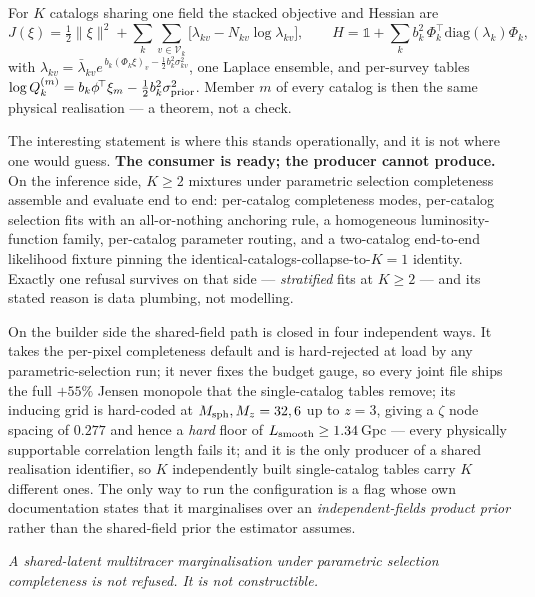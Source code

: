 \documentclass[11pt]{article}
\theoremstyle{definition}
\theoremstyle{remark}
\newcommand{\Msph}{M_{\rm sph}}
\newcommand{\Mz}{M_{z}}
\begin{document}
For $K$ catalogs sharing one field the stacked objective and Hessian are
\begin{equation}
  J(\xi)=\tfrac12\|\xi\|^2+\sum_{k}\sum_{v\in\mathcal V_k}
  \big[\lambda_{kv}-N_{kv}\log\lambda_{kv}\big],
  \qquad
  H=\mathbb 1+\sum_k b_k^2\,\Phi_k^{\!\top}\mathrm{diag}(\lambda_k)\Phi_k ,
  \label{eq:jointJ}
\end{equation}
with $\lambda_{kv}=\bar\lambda_{kv}e^{\,b_k(\Phi_k\xi)_v-\frac12b_k^2\sigma^2_{kv}}$,
one Laplace ensemble, and per-survey tables
$\log Q_k^{(m)}=b_k\phi^{\!\top}\xi_m-\frac12b_k^2\sigma^2_{\rm prior}$. Member $m$
of every catalog is then the same physical realisation --- a theorem, not a check.

The interesting statement is where this stands operationally, and it is not where
one would guess. \textbf{The consumer is ready; the producer cannot produce.} On
the inference side, $K\ge2$ mixtures under parametric selection completeness
assemble and evaluate end to end: per-catalog completeness modes, per-catalog
selection fits with an all-or-nothing anchoring rule, a homogeneous
luminosity-function family, per-catalog parameter routing, and a two-catalog
end-to-end likelihood fixture pinning the identical-catalogs-collapse-to-$K{=}1$
identity. Exactly one refusal survives on that side --- \emph{stratified} fits at
$K\ge2$ --- and its stated reason is data plumbing, not modelling.

On the builder side the shared-field path is closed in four independent ways. It
takes the per-pixel completeness default and is hard-rejected at load by any
parametric-selection run; it never fixes the budget gauge, so every joint file
ships the full $+55\%$ Jensen monopole that the single-catalog tables remove; its
inducing grid is hard-coded at $\Msph,\Mz=32,6$ up to $z=3$, giving a $\zeta$ node
spacing of $0.277$ and hence a \emph{hard} floor of $L_{\rm smooth}\ge1.34$\,Gpc ---
every physically supportable correlation length fails it; and it is the only
producer of a shared realisation identifier, so $K$ independently built
single-catalog tables carry $K$ different ones. The only way to run the
configuration is a flag whose own documentation states that it marginalises over
an \emph{independent-fields product prior} rather than the shared-field prior the
estimator assumes.

\begin{center}\itshape
A shared-latent multitracer marginalisation under parametric selection
completeness is not refused. It is not constructible.
\end{center}
\end{document}
